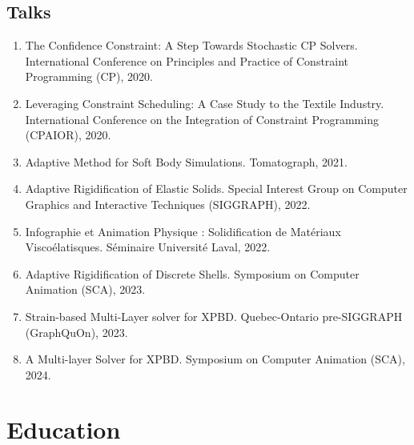 \documentclass[10pt]{article} %
\begin{document}
\subsection{Talks}
\begin{enumerate}
  \setcounter{enumi}{\value{listCounter}}
  \item The Confidence Constraint: A Step Towards Stochastic CP Solvers. International Conference on Principles and Practice of Constraint Programming (CP), 2020.
  \item  Leveraging Constraint Scheduling: A Case Study to the Textile Industry. International Conference on the Integration of Constraint Programming (CPAIOR), 2020.
  \item Adaptive Method for Soft Body Simulations. Tomatograph, 2021.
  \item Adaptive Rigidification of Elastic Solids. Special Interest Group on Computer Graphics and Interactive Techniques (SIGGRAPH), 2022. 
  \item Infographie et Animation Physique : Solidification de Matériaux Viscoélatisques.  Séminaire Université Laval, 2022.
  \item Adaptive Rigidification of Discrete Shells. Symposium on Computer Animation (SCA), 2023. 
  \item Strain-based Multi-Layer solver for XPBD. Quebec-Ontario pre-SIGGRAPH (GraphQuOn), 2023.
  \item A Multi-layer Solver for XPBD. Symposium on Computer Animation (SCA), 2024. 
\end{enumerate}

\section{Education}

\end{document}
